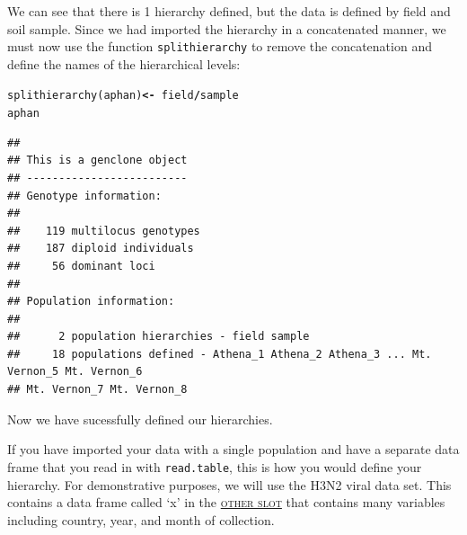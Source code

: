 \documentclass[letterpaper]{article}\usepackage[]{graphicx}\usepackage[]{color}
\makeatletter
\newcommand{\hlopt}[1]{\textcolor[rgb]{1,0,0.502}{\textbf{#1}}}%
\newcommand{\hlstd}[1]{\textcolor[rgb]{0,0,0}{#1}}%
\newcommand{\hlkwb}[1]{\textcolor[rgb]{0.502,0.502,0.753}{\textbf{#1}}}%
\newcommand{\hlkwd}[1]{\textcolor[rgb]{0,0.267,0.4}{#1}}%
\newenvironment{kframe}{%
 \def\at@end@of@kframe{}%
 \ifinner\ifhmode%
  \def\at@end@of@kframe{\end{minipage}}%
  \begin{minipage}{\columnwidth}%
 \fi\fi%
 \def\FrameCommand##1{\hskip\@totalleftmargin \hskip-\fboxsep
 \colorbox{shadecolor}{##1}\hskip-\fboxsep
     \hskip-\linewidth \hskip-\@totalleftmargin \hskip\columnwidth}%
 \MakeFramed {\advance\hsize-\width
   \@totalleftmargin\z@ \linewidth\hsize
   \@setminipage}}%
 {\par\unskip\endMakeFramed%
 \at@end@of@kframe}
\newenvironment{knitrout}{}{} %
\newcommand{\seclink}[2]{
  \textsc{\hyperref[#1]{#2}}
}
\makeatother
\begin{document}
\noindent
We can see that there is 1 hierarchy defined, but the data is defined by field
and soil sample. Since we had imported the hierarchy in a concatenated manner,
we must now use the function \texttt{splithierarchy} to remove the concatenation
and define the names of the hierarchical levels:

\begin{knitrout}\footnotesize
{}\color{fgcolor}\begin{kframe}
\begin{alltt}
\hlkwd{splithierarchy}\hlstd{(aphan)} \hlkwb{<-} \hlopt{~}\hlstd{field}\hlopt{/}\hlstd{sample}
\hlstd{aphan}
\end{alltt}
\begin{verbatim}
## 
## This is a genclone object
## -------------------------
## Genotype information:
## 
##    119 multilocus genotypes
##    187 diploid individuals
##     56 dominant loci
## 
## Population information:
## 
##      2 population hierarchies - field sample
##     18 populations defined - Athena_1 Athena_2 Athena_3 ... Mt. Vernon_5 Mt. Vernon_6 
## Mt. Vernon_7 Mt. Vernon_8
\end{verbatim}
\end{kframe}
\end{knitrout}

\noindent
Now we have sucessfully defined our hierarchies.

If you have imported your data with a single population and have a separate data
frame that you read in with \texttt{read.table}, this is how you would define
your hierarchy. For demonstrative purposes, we will use the H3N2 viral data set.
This contains a data frame called `x' in the\seclink{intro:genind:other}{other slot}that contains many variables including country, year, and month of collection. \label{data:virus}
\end{document}
